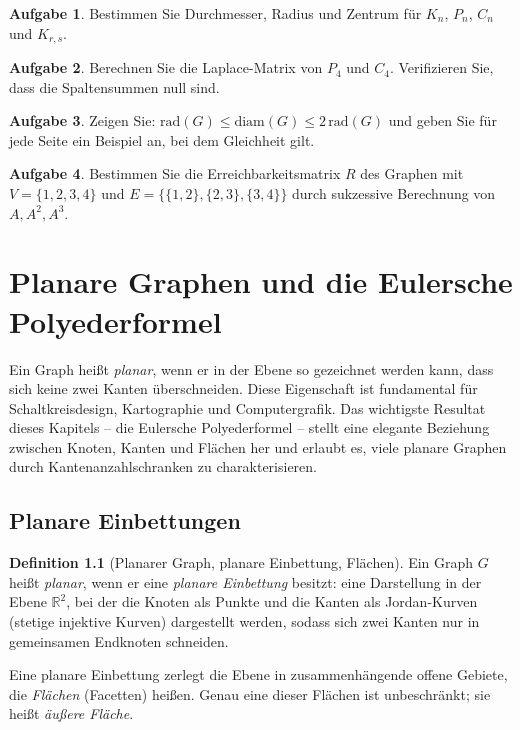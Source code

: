 ﻿\documentclass[a4paper,12pt,openany,oneside]{book}
\theoremstyle{definition}
\newtheorem{definition}{Definition}[chapter]
\newtheorem{aufgabe}{Aufgabe}[chapter]
\theoremstyle{plain}
\theoremstyle{remark}
\begin{document}
\begin{aufgabe}
  Bestimmen Sie Durchmesser, Radius und Zentrum f\"ur $K_n$, $P_n$,
  $C_n$ und $K_{r,s}$.
\end{aufgabe}

\begin{aufgabe}
  Berechnen Sie die Laplace-Matrix von $P_4$ und $C_4$.
  Verifizieren Sie, dass die Spaltensummen null sind.
\end{aufgabe}

\begin{aufgabe}
  Zeigen Sie: $\mathrm{rad}(G) \leq \mathrm{diam}(G) \leq 2\,\mathrm{rad}(G)$
  und geben Sie f\"ur jede Seite ein Beispiel an, bei dem Gleichheit gilt.
\end{aufgabe}

\begin{aufgabe}
  Bestimmen Sie die Erreichbarkeitsmatrix $R$ des Graphen mit
  $V = \{1,2,3,4\}$ und $E = \{\{1,2\},\{2,3\},\{3,4\}\}$ durch
  sukzessive Berechnung von $A, A^2, A^3$.
\end{aufgabe}
\chapter{Planare Graphen und die Eulersche Polyederformel}

Ein Graph hei\ss{}t \emph{planar}, wenn er in der Ebene so gezeichnet werden
kann, dass sich keine zwei Kanten \"uberschneiden. Diese Eigenschaft ist
fundamental f\"ur Schaltkreisdesign, Kartographie und Computergrafik. Das
wichtigste Resultat dieses Kapitels -- die Eulersche Polyederformel -- stellt
eine elegante Beziehung zwischen Knoten, Kanten und Fl\"achen her und erlaubt
es, viele planare Graphen durch Kantenanzahlschranken zu charakterisieren.

\section{Planare Einbettungen}

\begin{definition}[Planarer Graph, planare Einbettung, Fl\"achen]
  Ein Graph $G$ hei\ss{}t \emph{planar}, wenn er eine \emph{planare
  Einbettung} besitzt: eine Darstellung in der Ebene $\mathbb{R}^2$, bei
  der die Knoten als Punkte und die Kanten als Jordan-Kurven (stetige
  injektive Kurven) dargestellt werden, sodass sich zwei Kanten nur in
  gemeinsamen Endknoten schneiden.

  Eine planare Einbettung zerlegt die Ebene in zusammenh\"angende offene
  Gebiete, die \emph{Fl\"achen} (Facetten) hei\ss{}en. Genau eine dieser
  Fl\"achen ist unbeschr\"ankt; sie hei\ss{}t \emph{\"au\ss{}ere Fl\"ache}.
\end{definition}
\end{document}
